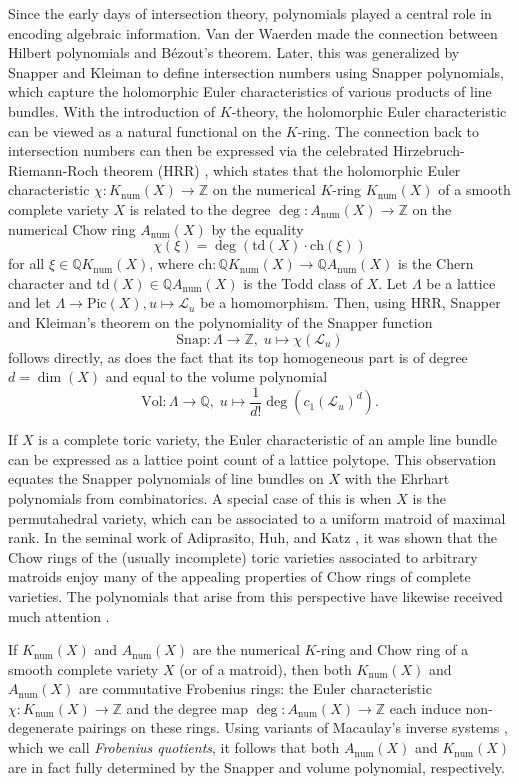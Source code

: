 \documentclass[oneside]{amsart}
\theoremstyle{plain}
\theoremstyle{definition}
\newcommand{\Z}{{\mathbb{Z}}}
\newcommand{\Q}{{\mathbb{Q}}}
\newcommand{\cL}{{\mathcal{L}}}
\newcommand{\Pic}{{\mathrm{Pic}}}
\newcommand{\Vol}{{\mathrm{Vol}}}
\newcommand{\Snap}{{\mathrm{Snap}}}
\newcommand{\ch}{{\mathrm{ch}}}
\newcommand{\td}{{\mathrm{td}}}
\newcommand{\num}{{\mathrm{num}}}
\begin{document}
Since the early days of intersection theory, polynomials played a central role in encoding algebraic information. Van der Waerden \cite{VanDerWaerden} made the connection between Hilbert polynomials and B\'ezout's theorem. Later, this was generalized by Snapper \cite{Snapper} and Kleiman \cite{KleimanSnapper} to define intersection numbers using Snapper polynomials, which capture the holomorphic Euler characteristics of various products of line bundles. With the introduction of $K$-theory, the holomorphic Euler characteristic can be viewed as a natural functional on the $K$-ring. The connection back to intersection numbers can then be expressed via the celebrated Hirzebruch-Riemann-Roch theorem (HRR) \cite{hirzebruch1956neue}, which states that the holomorphic Euler characteristic $\chi: K_\num(X) \to \Z$ on the numerical $K$-ring $K_\num(X)$ of a smooth complete variety $X$ is related to the degree $\deg: A_\num(X) \to \Z$ on the numerical Chow ring $A_\num(X)$ by the equality
\[
    \chi(\xi)= \deg(\td(X)\cdot\ch(\xi))
\]
for all $\xi \in \Q K_\num(X)$, where $\ch: \Q K_\num(X) \to \Q A_\num(X)$ is the Chern character and $\td(X) \in \Q A_\num(X)$ is the Todd class of $X$. Let $\Lambda$ be a lattice and let $\Lambda \to \Pic(X), u \mapsto \cL_u$ be a homomorphism. Then, using HRR,  Snapper and Kleiman's theorem on the polynomiality of the Snapper function 
\[
\Snap\colon \Lambda\to \Z, \; u \mapsto \chi(\cL_u)
\]
follows directly, as does the fact that its top homogeneous part is of degree $d=\dim(X)$ and equal to the volume polynomial
\[
\Vol\colon \Lambda\to \Q,\; u \mapsto \frac{1}{d!}\deg(c_1(\cL_u)^d).
\]



If $X$ is a complete toric variety, the Euler characteristic of an ample line bundle can be expressed as a lattice point count of a lattice polytope. This observation equates the Snapper polynomials of line bundles on $X$ with the Ehrhart polynomials from combinatorics. A special case of this is when $X$ is the permutahedral variety, which can be associated to a uniform matroid of maximal rank. In the seminal work of Adiprasito, Huh, and Katz \cite{CombinatorialHodge}, it was shown that the Chow rings of the (usually incomplete) toric varieties associated to arbitrary matroids enjoy many of the appealing properties of Chow rings of complete varieties. The polynomials that arise from this perspective have likewise received much attention \cite{NormalComplexes, LLPP24, EhrhartFans}.


If $K_\num(X)$ and $A_\num(X)$ are the numerical $K$-ring and Chow ring of a smooth complete variety
$X$ (or of a matroid), then both $K_\num(X)$ and $A_\num(X)$ are commutative Frobenius rings: the Euler characteristic $\chi: K_\num(X) \to \Z$ and the degree map $\deg: A_\num(X) \to \Z$ each induce non-degenerate pairings on these rings. 
Using variants of Macaulay's inverse systems \cite{InverseSystem}, which we call \emph{Frobenius quotients}, it follows that both $A_\num(X)$ and $K_\num(X)$ are in fact fully determined by the Snapper and volume polynomial, respectively.
\end{document}
